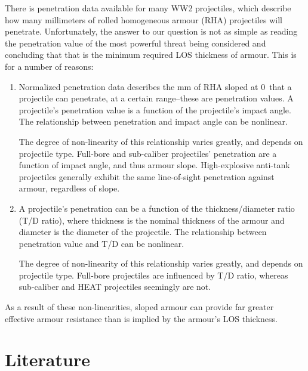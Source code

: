 \documentclass[]{article}
\begin{document}
\noindent There is penetration data available for many WW2 projectiles, which describe how many millimeters of rolled homogeneous armour (RHA) projectiles will penetrate. Unfortunately, the answer to our question is not as simple as reading the penetration value of the most powerful threat being considered and concluding that that is the minimum required LOS thickness of armour. This is for a number of reasons:

\begin{enumerate}
	\item Normalized penetration data describes the mm of RHA sloped at 0\degree\ that a projectile can penetrate, at a certain range--these are penetration values. A projectile’s penetration value is a function of the projectile’s impact angle. The relationship between penetration and impact angle can be nonlinear.
	
	The degree of non-linearity of this relationship varies greatly, and depends on projectile type. Full-bore and sub-caliber projectiles’ penetration are a function of impact angle, and thus armour slope. High-explosive anti-tank projectiles generally exhibit the same line-of-sight penetration against armour, regardless of slope. 
	
	\item A projectile’s penetration can be a function of the thickness/diameter ratio (T/D ratio), where thickness is the nominal thickness of the armour and diameter is the diameter of the projectile. The relationship between penetration value and T/D can be nonlinear.
	
	The degree of non-linearity of this relationship varies greatly, and depends on projectile type. Full-bore projectiles are influenced by T/D ratio, whereas sub-caliber and HEAT projectiles seemingly are not.
\end{enumerate}

\noindent As a result of these non-linearities, sloped armour can provide far greater effective armour resistance than is implied by the armour’s LOS thickness.

\section{Literature}
\end{document}

